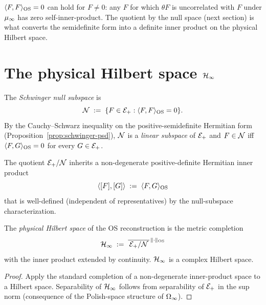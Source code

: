 \begin{remark}
\label{rem:schwinger-not-pd}
$\langle F, F \rangle_{\mathrm{OS}} = 0$ can hold for $F \ne 0$: any $F$ for which
$\theta F$ is uncorrelated with $F$ under $\mu_\infty$ has zero
self-inner-product.  The quotient by the null space (next section)
is what converts the semidefinite form into a definite inner
product on the physical Hilbert space.
\end{remark}

\section{The physical Hilbert space $\mathcal{H}_\infty$}
\label{sec:hilbert-space}

\begin{definition}
\label{def:null-subspace}
The \emph{Schwinger null subspace} is
\begin{equation*}
  \mathcal{N} \;:=\; \{ F \in \mathcal{E}_+ : \langle F, F \rangle_{\mathrm{OS}} = 0 \}.
\end{equation*}
By the Cauchy--Schwarz inequality on the positive-semidefinite
Hermitian form (Proposition~\ref{prop:schwinger-psd}), $\mathcal{N}$ is a
\emph{linear subspace} of $\mathcal{E}_+$ and $F \in \mathcal{N}$ iff
$\langle F, G \rangle_{\mathrm{OS}} = 0$ for every $G \in \mathcal{E}_+$.
\end{definition}

\begin{definition}
\label{def:pre-hilbert-quotient}
The quotient $\mathcal{E}_+ / \mathcal{N}$ inherits a non-degenerate
positive-definite Hermitian inner product
\begin{equation*}
  \langle [F], [G] \rangle \;:=\; \langle F, G \rangle_{\mathrm{OS}}
\end{equation*}
that is well-defined (independent of representatives) by the
null-subspace characterization.
\end{definition}

\begin{theorem}
\label{thm:physical-hilbert-space}
The \emph{physical Hilbert space} of the OS reconstruction is the
metric completion
\begin{equation*}
  \mathcal{H}_\infty \;:=\; \overline{\,\mathcal{E}_+ / \mathcal{N}\,}^{\,\|\cdot\|_{\mathrm{OS}}}
\end{equation*}
with the inner product extended by continuity.  $\mathcal{H}_\infty$ is a complex
Hilbert space.
\end{theorem}

\begin{proof}
Apply the standard completion of a non-degenerate inner-product
space to a Hilbert space.  Separability of $\mathcal{H}_\infty$ follows from
separability of $\mathcal{E}_+$ in the sup norm
(consequence of the Polish-space structure of $\Omega_\infty$).
\end{proof}

